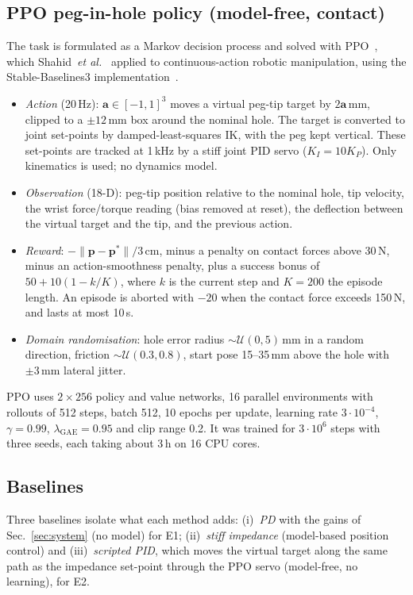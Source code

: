 \documentclass[conference]{IEEEtran}
\begin{document}
\subsection{PPO peg-in-hole policy (model-free, contact)}
The task is formulated as a Markov decision process and solved with PPO~\cite{schulman2017}, which Shahid~\emph{et al.}~\cite{shahid2022} applied to continuous-action robotic manipulation, using the Stable-Baselines3 implementation~\cite{raffin2021}.
\begin{itemize}
\item \emph{Action} (20\,Hz): $\boldsymbol{a}\in[-1,1]^3$ moves a virtual peg-tip target by $2\boldsymbol{a}$\,mm, clipped to a $\pm12$\,mm box around the nominal hole. The target is converted to joint set-points by damped-least-squares IK, with the peg kept vertical. These set-points are tracked at 1\,kHz by a stiff joint PID servo ($K_I=10K_P$). Only kinematics is used; no dynamics model.
\item \emph{Observation} (18-D): peg-tip position relative to the nominal hole, tip velocity, the wrist force/torque reading (bias removed at reset), the deflection between the virtual target and the tip, and the previous action.
\item \emph{Reward}: $-\|\boldsymbol{p}-\boldsymbol{p}^*\|/3\,\mathrm{cm}$, minus a penalty on contact forces above 30\,N, minus an action-smoothness penalty, plus a success bonus of $50+10(1-k/K)$, where $k$ is the current step and $K=200$ the episode length. An episode is aborted with $-20$ when the contact force exceeds 150\,N, and lasts at most 10\,s.
\item \emph{Domain randomisation}: hole error radius $\sim\mathcal{U}(0,5)$\,mm in a random direction, friction $\sim\mathcal{U}(0.3,0.8)$, start pose 15--35\,mm above the hole with $\pm3$\,mm lateral jitter.
\end{itemize}
PPO uses $2\times256$ policy and value networks, 16 parallel environments with rollouts of 512 steps, batch 512, 10 epochs per update, learning rate $3\cdot10^{-4}$, $\gamma=0.99$, $\lambda_{\mathrm{GAE}}=0.95$ and clip range 0.2. It was trained for $3\cdot10^6$ steps with three seeds, each taking about 3\,h on 16 CPU cores.

\subsection{Baselines}
Three baselines isolate what each method adds: (i)~\emph{PD} with the gains of Sec.~\ref{sec:system} (no model) for E1; (ii)~\emph{stiff impedance} (model-based position control) and (iii)~\emph{scripted PID}, which moves the virtual target along the same path as the impedance set-point through the PPO servo (model-free, no learning), for E2.
\end{document}
